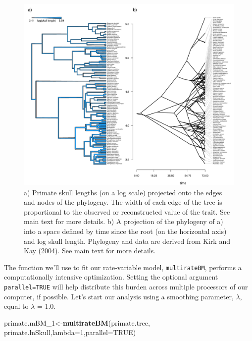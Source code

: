 \documentclass[fleqn,10pt,lineno]{wlpeerj} %
\newenvironment{Shaded}{\begin{snugshade}}{\end{snugshade}}
\newcommand{\AttributeTok}[1]{\textcolor[rgb]{0.13,0.29,0.53}{#1}}
\newcommand{\ConstantTok}[1]{\textcolor[rgb]{0.56,0.35,0.01}{#1}}
\newcommand{\DecValTok}[1]{\textcolor[rgb]{0.00,0.00,0.81}{#1}}
\newcommand{\FunctionTok}[1]{\textcolor[rgb]{0.13,0.29,0.53}{\textbf{#1}}}
\newcommand{\NormalTok}[1]{#1}
\newcommand{\OtherTok}[1]{\textcolor[rgb]{0.56,0.35,0.01}{#1}}
\begin{document}
\begin{figure}
\includegraphics[width=1\linewidth]{Revell.phytools-v2_peerj_files/figure-latex/primate-edgewidth-1} \caption{a) Primate skull lengths (on a log scale) projected onto the edges and nodes of the phylogeny. The width of each edge of the tree is proportional to the observed or reconstructed value of the trait. See main text for more details. b) A projection of the phylogeny of a) into a space defined by time since the root (on the horizontal axis) and log skull length. Phylogeny and data are derived from Kirk and Kay (2004). See main text for more details.}\label{fig:primate-edgewidth}
\end{figure}

The function we'll use to fit our rate-variable model, \texttt{multirateBM}, performs a computationally intensive optimization. Setting the optional argument \texttt{parallel=TRUE} will help distribute this burden across multiple processors of our computer, if possible. Let's start our analysis using a smoothing parameter, \(\lambda\), equal to \(\lambda\) = 1.0.

\begin{Shaded}
\begin{Highlighting}[]
\NormalTok{primate.mBM\_1}\OtherTok{\textless{}{-}}\FunctionTok{multirateBM}\NormalTok{(primate.tree,}
\NormalTok{  primate.lnSkull,}\AttributeTok{lambda=}\DecValTok{1}\NormalTok{,}\AttributeTok{parallel=}\ConstantTok{TRUE}\NormalTok{)}
\end{Highlighting}
\end{Shaded}
\end{document}
